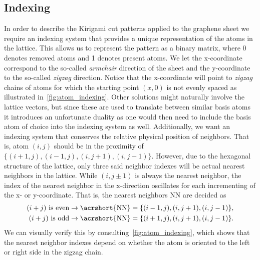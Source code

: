

\subsection{Indexing}
In order to describe the Kirigami cut patterns applied to the graphene sheet we require an indexing system that provides a unique representation of the atoms in the lattice. This allows us to represent the pattern as a binary matrix, where 0 denotes removed atoms and 1 denotes present atoms. We let the x-coordinate correspond to the so-called \textit{armchair} direction of the sheet and the y-coordinate to the so-called \textit{zigzag} direction. Notice that the x-coordinate will point to \textit{zigzag} chains of atoms for which the starting point $(x, 0)$ is not evenly spaced as illustrated in~\cref{fig:atom_indexing}. Other
solutions might naturally involve the lattice vectors, but since these are used
to translate between similar basis atoms it introduces an unfortunate duality as
one would then need to include the basis atom of choice into the indexing system
as well. Additionally, we want an indexing system that conserves the relative
physical position of neighbors. That is, atom $(i, j)$ should be in the
proximity of $\{(i+1, j), (i-1, j), (i, j+1), (i, j-1)\}$. However, due to the
hexagonal structure of the lattice, only three said neighbor indexes will be
actual nearest neighbors in the lattice. While $(i, j\pm 1)$ is always the nearest
neighbor, the index of the nearest neighbor in the x-direction oscillates for
each incrementing of the x- or y-coordinate. That is, the nearest neighbors \acrshort{NN} are decided as
\begin{equation}
  \begin{aligned}
    (i + j) \ \text{is even} &\rightarrow \text{\acrshort{NN}} = \{(i-1, j), (i, j+1), (i, j-1)\}, \\
    (i + j) \ \text{is odd} &\rightarrow \text{\acrshort{NN}} = \{(i+1, j), (i, j+1), (i, j-1)\}.
  \end{aligned}
  \label{eq:atom_neigh_idx}
\end{equation}
We can visually verify this by consulting~\cref{fig:atom_indexing}, which shows that the nearest neighbor indexes depend on whether the atom is oriented to the left or right side in the zigzag chain.

